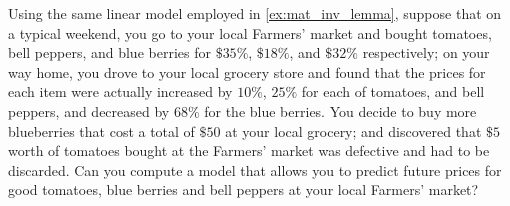 \begin{homework}
	Using the same linear model employed in \ref{ex:mat_inv_lemma}, suppose that on a typical weekend, you go to your local Farmers' market and bought tomatoes, bell peppers, and blue berries for $\$35\%$, $\$18\%$, and $\$32\%$ respectively; on your way home, you drove to your local grocery store and found that the prices for each item were actually increased by $10\%$, $25\%$ for each of tomatoes, and bell peppers, and decreased by $68\%$  for the blue berries. You decide to buy more blueberries that cost a total of $\$50$ at your local grocery; and discovered that $\$5$ worth of tomatoes bought at the Farmers' market was defective and had to be discarded. Can you compute a model that allows you to predict future prices for good tomatoes, blue berries and bell peppers at your local Farmers' market?
\end{homework}